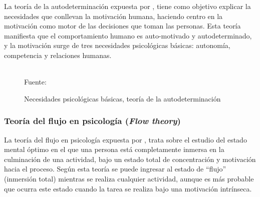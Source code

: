 La teoría de la autodeterminación expuesta por , tiene como objetivo explicar la 
necesidades que conllevan la motivación humana, haciendo centro en la motivación como motor de las decisiones 
que toman las personas. Esta teoría manifiesta que el comportamiento humano es auto-motivado y
autodeterminado, y la motivación surge de tres necesidades psicológicas básicas: autonomía, competencia y 
relaciones humanas.

\begin{figure}[ht]
\caption{Necesidades psicológicas básicas, teoría de la autodeterminación}
\label{img:SDT}
\centering
{}
\\
{\footnotesize Fuente: \citeA<basada en>{deci1985intrinsic}}
\end{figure}

\subsubsection{Teoría del flujo en psicología (\textit{Flow theory})}

La teoría del flujo en psicología expuesta por , trata sobre el estudio del estado 
mental óptimo en el que una persona está completamente inmersa en la culminación de una actividad, bajo un
estado total de concentración y motivación hacia el proceso. Según esta teoría se puede ingresar al estado de 
``flujo'' (inmersión total) mientras se realiza cualquier actividad, aunque es más probable que ocurra este
estado cuando la tarea se realiza bajo una motivación intrínseca.

